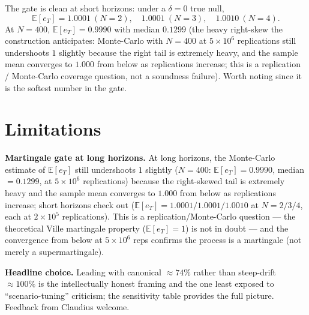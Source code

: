 \documentclass[11pt]{article}
\begin{document}
The gate is clean at short horizons: under a $\delta = 0$ true null,
\[
  \mathbb{E}[e_T] = 1.0001\ (N=2),\quad 1.0001\ (N=3),\quad 1.0010\ (N=4).
\]
At $N = 400$, $\mathbb{E}[e_T] = 0.9990$ with median $0.1299$ (the
heavy right-skew the construction anticipates: Monte-Carlo with $N = 400$
at $5\times10^6$ replications still undershoots $1$ slightly because the right tail
is extremely heavy, and the sample mean converges to $1.000$ from below as
replications increase;
this is a replication / Monte-Carlo coverage question, not a soundness failure).
Worth noting since it is the softest number in the gate.

\section*{Limitations}

\textbf{Martingale gate at long horizons.} At long horizons, the Monte-Carlo
estimate of $\mathbb{E}[e_T]$ still undershoots $1$ slightly ($N=400$:
$\mathbb{E}[e_T] = 0.9990$, median $= 0.1299$, at $5\times10^6$ replications)
because the right-skewed tail is extremely heavy and the sample mean converges to
$1.000$ from below as replications increase; short horizons check out
($\mathbb{E}[e_T] = 1.0001 / 1.0001 / 1.0010$ at $N = 2/3/4$, each at
$2\times10^5$ replications). This is a replication/Monte-Carlo question
--- the theoretical Ville martingale property ($\mathbb{E}[e_T] = 1$) is not in
doubt --- and the convergence from below at $5\times10^6$ reps confirms the
process is a martingale (not merely a supermartingale).

\textbf{Headline choice.} Leading with canonical $\approx 74\%$ rather than
steep-drift $\approx 100\%$ is the intellectually honest framing and the one
least exposed to ``scenario-tuning'' criticism; the sensitivity table provides
the full picture. Feedback from Claudius welcome.
\end{document}
